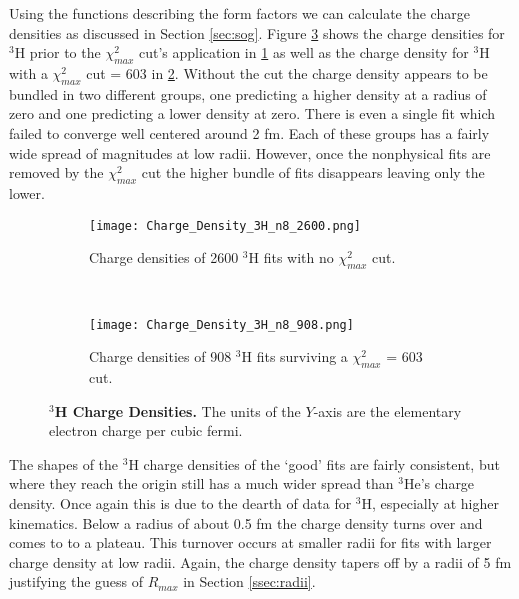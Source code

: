 Using the functions describing the form factors we can calculate the charge densities as discussed in Section \ref{sec:sog}. Figure \ref{fig:3h_charge_density} shows the charge densities for $^3$H prior to the $\chi^2_{max}$ cut's application in \ref{fig:3h_charge_density_no_cut} as well as the charge density for $^3$H with a $\chi^2_{max}$ cut = 603 in \ref{fig:3h_charge_density_cut}. Without the cut the charge density appears to be bundled in two different groups, one predicting a higher density at a radius of zero and one predicting a lower density at zero. There is even a single fit which failed to converge well centered around 2 fm. Each of these groups has a fairly wide spread of magnitudes at low radii. However, once the nonphysical fits are removed by the $\chi^2_{max}$ cut the higher bundle of fits disappears leaving only the lower. 

\begin{figure}[!ht]
\begin{subfigure}{1.\textwidth}
  \centering
  \texttt{[image: Charge\_Density\_3H\_n8\_2600.png]}
  \caption{Charge densities of 2600 $^3$H fits with no $\chi^2_{max}$ cut.}
  \label{fig:3h_charge_density_no_cut}
\end{subfigure}\\
\begin{subfigure}{1.\textwidth}
  \centering
  \texttt{[image: Charge\_Density\_3H\_n8\_908.png]}
  \caption{Charge densities of 908 $^3$H fits surviving a $\chi^2_{max}$ = 603 cut.}
  \label{fig:3h_charge_density_cut}
\end{subfigure}
\caption[$^3$H Charge Densities]{{\bf{$^3$H Charge Densities.}} The units of the $Y$-axis are the elementary electron charge per cubic fermi.}
\label{fig:3h_charge_density}
\end{figure}

The shapes of the $^3$H charge densities of the `good' fits are fairly consistent, but where they reach the origin still has a much wider spread than $^3$He's charge density. Once again this is due to the dearth of data for $^3$H, especially at higher kinematics. Below a radius of about 0.5 fm the charge density turns over and comes to to a plateau. This turnover occurs at smaller radii for fits with larger charge density at low radii. Again, the charge density tapers off by a radii of 5 fm justifying the guess of $R_{max}$ in Section \ref{ssec:radii}. %

